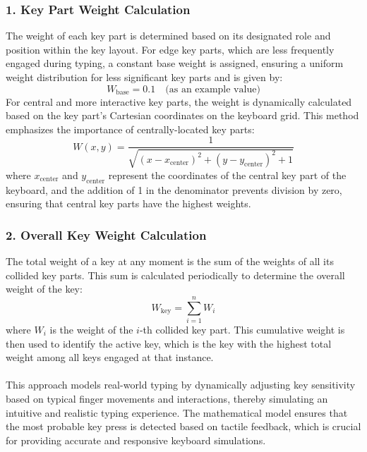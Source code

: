 \subsubsection*{1. Key Part Weight Calculation}
The weight of each key part is determined based on its designated role and position within the key layout. For edge key parts, which are less frequently engaged during typing, a constant base weight is assigned, ensuring a uniform weight distribution for less significant key parts and is given by:
\begin{equation}
W_{\text{base}} = 0.1 \quad \text{(as an example value)}
\end{equation}
For central and more interactive key parts, the weight is dynamically calculated based on the key part's Cartesian coordinates on the keyboard grid. This method emphasizes the importance of centrally-located key parts:
\begin{equation}
W(x, y) = \frac{1}{\sqrt{(x - x_{\text{center}})^2 + (y - y_{\text{center}})^2 + 1}}
\end{equation}
where $x_{\text{center}}$ and $y_{\text{center}}$ represent the coordinates of the central key part of the keyboard, and the addition of 1 in the denominator prevents division by zero, ensuring that central key parts have the highest weights.

\subsubsection*{2. Overall Key Weight Calculation}
The total weight of a key at any moment is the sum of the weights of all its collided key parts. This sum is calculated periodically to determine the overall weight of the key:
\begin{equation}
W_{\text{key}} = \sum_{i=1}^{n} W_i
\end{equation}
where $W_i$ is the weight of the $i$-th collided key part. This cumulative weight is then used to identify the active key, which is the key with the highest total weight among all keys engaged at that instance.\\ \\
This approach models real-world typing by dynamically adjusting key sensitivity based on typical finger movements and interactions, thereby simulating an intuitive and realistic typing experience. The mathematical model ensures that the most probable key press is detected based on tactile feedback, which is crucial for providing accurate and responsive keyboard simulations.


